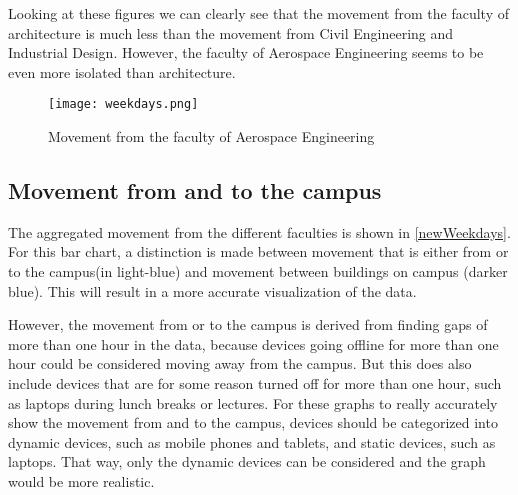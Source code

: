 Looking at these figures we can clearly see that the movement from the faculty of architecture is much less than the movement from Civil Engineering and Industrial Design.  However, the faculty of Aerospace Engineering seems to be even more isolated than architecture. 

\begin{figure}[H]
\centering
\texttt{[image: weekdays.png]}
\captionsetup{justification=centering}
\caption{Movement from the faculty of Aerospace Engineering}
\label{newWeekdays}
\end{figure} 

\subsection{Movement from and to the campus}
The aggregated movement from the different faculties is shown in \autoref{newWeekdays}. For this bar chart, a distinction is made between movement that is either from or to the campus(in light-blue) and movement between buildings on campus (darker blue). This will result in a more accurate visualization of the data.

However, the movement from or to the campus is derived from finding gaps of more than one hour in the data, because devices going offline for more than one hour could be considered moving away from the campus. But this does also include devices that are for some reason turned off for more than one hour, such as laptops during lunch breaks or lectures. For these graphs to really accurately show the movement from and to the campus, devices should be categorized into dynamic devices, such as mobile phones and tablets, and static devices, such as laptops. That way, only the dynamic devices can be considered and the graph would be more realistic.